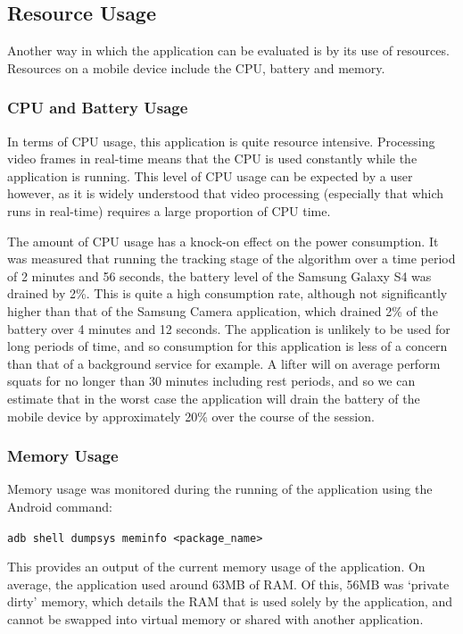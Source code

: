 \subsection{Resource Usage}

Another way in which the application can be evaluated is by its use of resources. Resources on a mobile device include the CPU, battery and memory.

\subsubsection{CPU and Battery Usage}
In terms of CPU usage, this application is quite resource intensive. Processing video frames in real-time means that the CPU is used constantly while the application is running. This level of CPU usage can be expected by a user however, as it is widely understood that video processing (especially that which runs in real-time) requires a large proportion of CPU time.

The amount of CPU usage has a knock-on effect on the power consumption. It was measured that running the tracking stage of the algorithm over a time period of 2 minutes and 56 seconds, the battery level of the Samsung Galaxy S4 was drained by 2\%. This is quite a high consumption rate, although not significantly higher than that of the Samsung Camera application, which drained 2\% of the battery over 4 minutes and 12 seconds. The application is unlikely to be used for long periods of time, and so consumption for this application is less of a concern than that of a background service for example. A lifter will on average perform squats for no longer than 30 minutes including rest periods, and so we can estimate that in the worst case the application will drain the battery of the mobile device by approximately 20\% over the course of the session.

\subsubsection{Memory Usage}
Memory usage was monitored during the running of the application using the Android command:

\texttt{adb shell dumpsys meminfo <package\_name>}

This provides an output of the current memory usage of the application. On average, the application used around 63MB of RAM. Of this, 56MB was `private dirty' memory, which details the RAM that is used solely by the application, and cannot be swapped into virtual memory or shared with another application.

